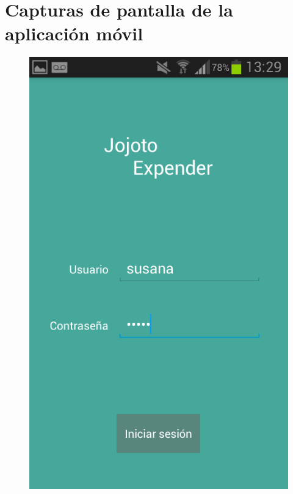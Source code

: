 \chapter{Capturas de pantalla de la aplicación móvil} \label{chap: Screenshots mobile}

\begin{figure}[ht]
\centering
\begin{minipage}{.5\textwidth}
  \centering
  \includegraphics[scale=0.30,type=png,ext=.png,read=.png]{imagenes/Screenshots/login_mobile}
  \captionsetup{justification=centering}
  \label{fig:interfazLoginMobile}
\end{minipage}%

\end{figure}
